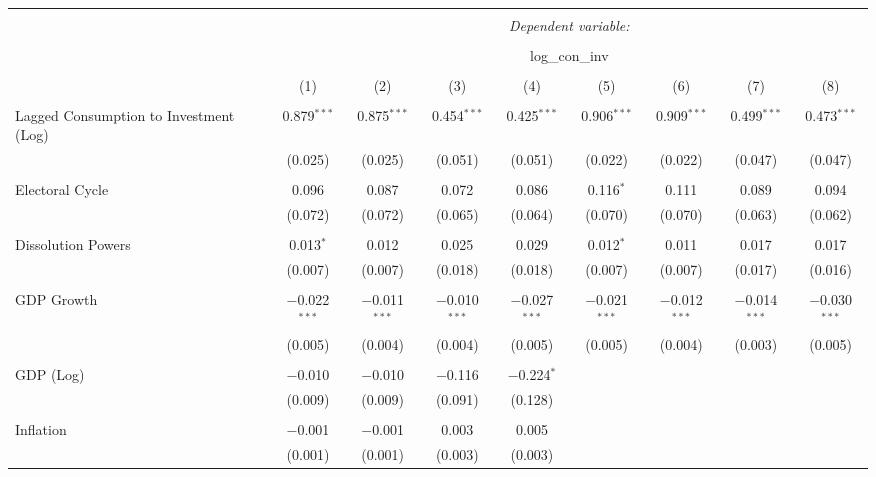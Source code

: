 
\begin{table}[!htbp] \centering 
  \caption{} 
  \label{} 
\begin{tabular}{@{\extracolsep{5pt}}lcccccccc} 
\\[-1.8ex]\hline 
\hline \\[-1.8ex] 
 & \multicolumn{8}{c}{\textit{Dependent variable:}} \\ 
\cline{2-9} 
\\[-1.8ex] & \multicolumn{8}{c}{log\_con\_inv} \\ 
\\[-1.8ex] & (1) & (2) & (3) & (4) & (5) & (6) & (7) & (8)\\ 
\hline \\[-1.8ex] 
 Lagged Consumption to Investment (Log) & 0.879$^{***}$ & 0.875$^{***}$ & 0.454$^{***}$ & 0.425$^{***}$ & 0.906$^{***}$ & 0.909$^{***}$ & 0.499$^{***}$ & 0.473$^{***}$ \\ 
  & (0.025) & (0.025) & (0.051) & (0.051) & (0.022) & (0.022) & (0.047) & (0.047) \\ 
  & & & & & & & & \\ 
 Electoral Cycle & 0.096 & 0.087 & 0.072 & 0.086 & 0.116$^{*}$ & 0.111 & 0.089 & 0.094 \\ 
  & (0.072) & (0.072) & (0.065) & (0.064) & (0.070) & (0.070) & (0.063) & (0.062) \\ 
  & & & & & & & & \\ 
 Dissolution Powers & 0.013$^{*}$ & 0.012 & 0.025 & 0.029 & 0.012$^{*}$ & 0.011 & 0.017 & 0.017 \\ 
  & (0.007) & (0.007) & (0.018) & (0.018) & (0.007) & (0.007) & (0.017) & (0.016) \\ 
  & & & & & & & & \\ 
 GDP Growth & $-$0.022$^{***}$ & $-$0.011$^{***}$ & $-$0.010$^{***}$ & $-$0.027$^{***}$ & $-$0.021$^{***}$ & $-$0.012$^{***}$ & $-$0.014$^{***}$ & $-$0.030$^{***}$ \\ 
  & (0.005) & (0.004) & (0.004) & (0.005) & (0.005) & (0.004) & (0.003) & (0.005) \\ 
  & & & & & & & & \\ 
 GDP (Log) & $-$0.010 & $-$0.010 & $-$0.116 & $-$0.224$^{*}$ &  &  &  &  \\ 
  & (0.009) & (0.009) & (0.091) & (0.128) &  &  &  &  \\ 
  & & & & & & & & \\ 
 Inflation & $-$0.001 & $-$0.001 & 0.003 & 0.005 &  &  &  &  \\ 
  & (0.001) & (0.001) & (0.003) & (0.003) &  &  &  &  \\ 

\end{tabular}
\end{table}
